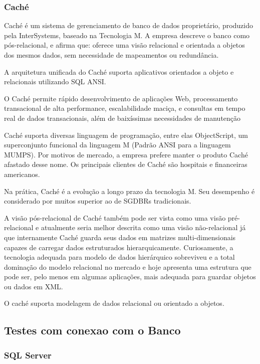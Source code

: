 \subsubsection{Caché} 

Caché é um sistema de gerenciamento de banco de dados proprietário, produzido pela InterSystems, baseado na Tecnologia M.
A empresa descreve o banco como pós-relacional, e afirma que: oferece uma visão relacional e orientada a objetos dos mesmos dados, sem necessidade de mapeamentos ou redundância.

A arquitetura unificada do Caché suporta aplicativos orientados a objeto e relacionais utilizando SQL ANSI.

O Caché permite rápido desenvolvimento de aplicações Web, processamento transacional de alta performance, escalabilidade maciça, e consultas em tempo real de dados transacionais, além de baixíssimas necessidades de manutenção

Caché suporta diversas linguagem de programação, entre elas ObjectScript, um superconjunto funcional da linguagem M (Padrão ANSI para a linguagem MUMPS). Por motivos de mercado, a empresa prefere manter o produto Caché afastado desse nome. Os principais clientes de Caché são hospitais e financeiras americanos.

Na prática, Caché é a evolução a longo prazo da tecnologia M. Seu desempenho é considerado por muitos superior ao de SGDBRs tradicionais.

A visão pós-relacional de Caché também pode ser vista como uma visão pré-relacional e atualmente seria melhor descrita como uma visão não-relacional já que internamente Caché guarda seus dados em matrizes multi-dimensionais capazes de carregar dados estruturados hierarquicamente. Curiosamente, a tecnologia adequada para modelo de dados hierárquico sobreviveu e a total dominação do modelo relacional no mercado e hoje apresenta uma estrutura que pode ser, pelo menos em algumas aplicações, mais adequada para guardar objetos ou dados em XML.

O caché suporta modelagem de dados relacional ou orientado a objetos. \cite{cache}

\subsection{Testes com conexao com o Banco}
\label{cha:conexao}

\subsubsection{SQL Server}

